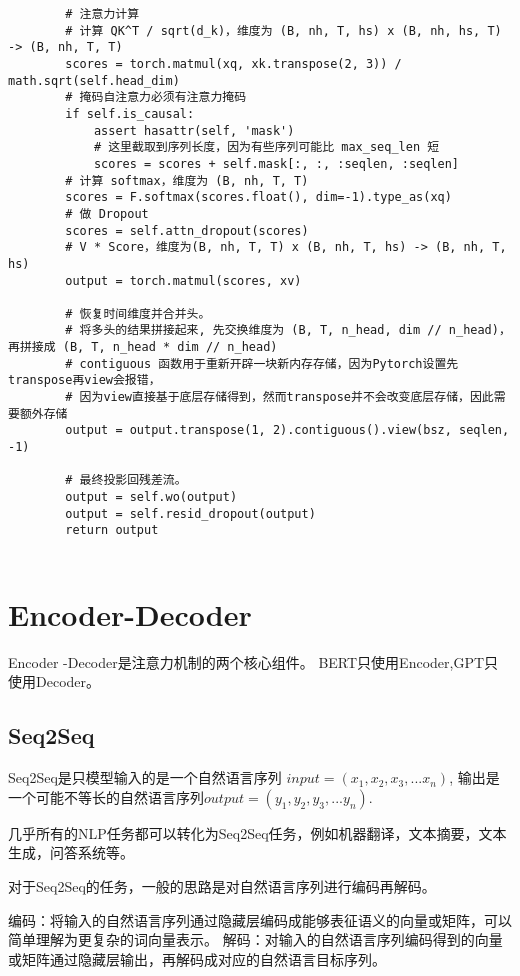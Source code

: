\documentclass{article}
\begin{document}
\begin{verbatim}
        # 注意力计算
        # 计算 QK^T / sqrt(d_k)，维度为 (B, nh, T, hs) x (B, nh, hs, T) -> (B, nh, T, T)
        scores = torch.matmul(xq, xk.transpose(2, 3)) / math.sqrt(self.head_dim)
        # 掩码自注意力必须有注意力掩码
        if self.is_causal:
            assert hasattr(self, 'mask')
            # 这里截取到序列长度，因为有些序列可能比 max_seq_len 短
            scores = scores + self.mask[:, :, :seqlen, :seqlen]
        # 计算 softmax，维度为 (B, nh, T, T)
        scores = F.softmax(scores.float(), dim=-1).type_as(xq)
        # 做 Dropout
        scores = self.attn_dropout(scores)
        # V * Score，维度为(B, nh, T, T) x (B, nh, T, hs) -> (B, nh, T, hs)
        output = torch.matmul(scores, xv)

        # 恢复时间维度并合并头。
        # 将多头的结果拼接起来, 先交换维度为 (B, T, n_head, dim // n_head)，再拼接成 (B, T, n_head * dim // n_head)
        # contiguous 函数用于重新开辟一块新内存存储，因为Pytorch设置先transpose再view会报错，
        # 因为view直接基于底层存储得到，然而transpose并不会改变底层存储，因此需要额外存储
        output = output.transpose(1, 2).contiguous().view(bsz, seqlen, -1)

        # 最终投影回残差流。
        output = self.wo(output)
        output = self.resid_dropout(output)
        return output
            

\end{verbatim}



\section{Encoder-Decoder}
Encoder -Decoder是注意力机制的两个核心组件。
BERT只使用Encoder,GPT只使用Decoder。

\subsection{Seq2Seq}
Seq2Seq是只模型输入的是一个自然语言序列 $input = (x_1,x_2,x_3,...x_n)$,
输出是一个可能不等长的自然语言序列$output = (y_1, y_2, y_3, ...y_n)$.

几乎所有的NLP任务都可以转化为Seq2Seq任务，例如机器翻译，文本摘要，文本生成，问答系统等。

对于Seq2Seq的任务，一般的思路是对自然语言序列进行编码再解码。

编码：将输入的自然语言序列通过隐藏层编码成能够表征语义的向量或矩阵，可以简单理解为更复杂的词向量表示。
解码：对输入的自然语言序列编码得到的向量或矩阵通过隐藏层输出，再解码成对应的自然语言目标序列。
\end{document}
